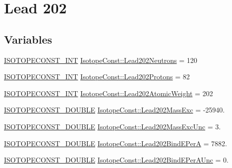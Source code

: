 \hypertarget{group___isotope_const-_lead-_pb202}{}\section{Lead 202}
\label{group___isotope_const-_lead-_pb202}
\subsection*{Variables}
\begin{DoxyCompactItemize}
\item 
\mbox{\hyperlink{group___isotope_const-_macros_ga5f18360b3e99483a35c32d789e62621c}{I\+S\+O\+T\+O\+P\+E\+C\+O\+N\+S\+T\+\_\+\+I\+NT}} \mbox{\hyperlink{group___isotope_const-_lead-_pb202_gacebc3622288a506f9120694549c5212c}{Isotope\+Const\+::\+Lead202\+Neutrons}} = 120
\item 
\mbox{\hyperlink{group___isotope_const-_macros_ga5f18360b3e99483a35c32d789e62621c}{I\+S\+O\+T\+O\+P\+E\+C\+O\+N\+S\+T\+\_\+\+I\+NT}} \mbox{\hyperlink{group___isotope_const-_lead-_pb202_gae3b13751db72290ad64cff9d91bccd48}{Isotope\+Const\+::\+Lead202\+Protons}} = 82
\item 
\mbox{\hyperlink{group___isotope_const-_macros_ga5f18360b3e99483a35c32d789e62621c}{I\+S\+O\+T\+O\+P\+E\+C\+O\+N\+S\+T\+\_\+\+I\+NT}} \mbox{\hyperlink{group___isotope_const-_lead-_pb202_gafc7addef86160784e8920d599b20b4fc}{Isotope\+Const\+::\+Lead202\+Atomic\+Weight}} = 202
\item 
\mbox{\hyperlink{group___isotope_const-_macros_ga8f45a7272ce02c0b4c65c44636ed719a}{I\+S\+O\+T\+O\+P\+E\+C\+O\+N\+S\+T\+\_\+\+D\+O\+U\+B\+LE}} \mbox{\hyperlink{group___isotope_const-_lead-_pb202_ga820c66725835eaafa3b05ce22c846eb7}{Isotope\+Const\+::\+Lead202\+Mass\+Exc}} = -\/25940.
\item 
\mbox{\hyperlink{group___isotope_const-_macros_ga8f45a7272ce02c0b4c65c44636ed719a}{I\+S\+O\+T\+O\+P\+E\+C\+O\+N\+S\+T\+\_\+\+D\+O\+U\+B\+LE}} \mbox{\hyperlink{group___isotope_const-_lead-_pb202_ga720697c4fcc910153788957b5e28d246}{Isotope\+Const\+::\+Lead202\+Mass\+Exc\+Unc}} = 3.
\item 
\mbox{\hyperlink{group___isotope_const-_macros_ga8f45a7272ce02c0b4c65c44636ed719a}{I\+S\+O\+T\+O\+P\+E\+C\+O\+N\+S\+T\+\_\+\+D\+O\+U\+B\+LE}} \mbox{\hyperlink{group___isotope_const-_lead-_pb202_ga4e20cbcd8cb25ad21de94f261388e822}{Isotope\+Const\+::\+Lead202\+Bind\+E\+PerA}} = 7882.
\item 
\mbox{\hyperlink{group___isotope_const-_macros_ga8f45a7272ce02c0b4c65c44636ed719a}{I\+S\+O\+T\+O\+P\+E\+C\+O\+N\+S\+T\+\_\+\+D\+O\+U\+B\+LE}} \mbox{\hyperlink{group___isotope_const-_lead-_pb202_ga55c86967130d30856a77d56b5870d808}{Isotope\+Const\+::\+Lead202\+Bind\+E\+Per\+A\+Unc}} = 0.

\end{DoxyCompactItemize}
